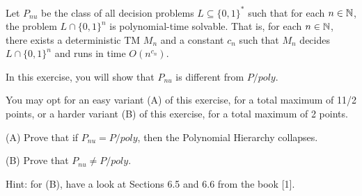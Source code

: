 \begin{question}
    Let  $P_{nu}$ be the class of all decision 
    problems $L \subseteq \{0, 1\}^*$ 
    such that for each $n \in \mathbb{N}$, 
    the problem $L \cap \{0, 1\}^n$ 
    is polynomial-time solvable. 
    That is, for each $n \in \mathbb{N}$, 
    there exists a deterministic TM $M_n$ 
    and a constant $c_n$ such that 
    $M_n$ decides $L \cap \{0, 1\}^n$ and 
    runs in time $O(n^{c_n})$.
    \par In this exercise, you will show that $P_{nu}$
    is different from $P/poly$. 
    \par You may opt for an easy variant (A) of this
    exercise, for a total maximum of 11/2 points,
    or a harder variant (B) of this exercise,
    for a total maximum of 2 points.
    \par (A) Prove that if $P_{nu} = P/poly$, 
    then the Polynomial Hierarchy collapses.
    \par (B) Prove that $P_{nu} \neq P/poly$.
    \par Hint: for (B), have a look at Sections 6.5 and 6.6 from the book [1].
    
\end{question}